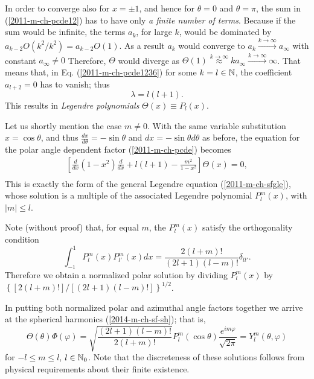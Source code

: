 In order to converge also for $x=\pm 1$, and hence for $\theta =0$ and $\theta= \pi$,
the sum in (\ref{2011-m-ch-pcde12})
has to have only {\em a finite number of terms}.
Because  if the sum would be infinite, the terms $a_k$, for large $k$,
would be dominated by $a_{k-2} O( k^2/k^2)= a_{k-2} O(1)$.
As a result  $a_k$
would converge to $a_k \stackrel{ k  \rightarrow \infty}{\longrightarrow} a_\infty$ with constant $a_\infty \neq 0$
Therefore, $\Theta$ would diverge as
$\Theta (1) \stackrel{ k  \rightarrow \infty}{\approx} k a_\infty  \stackrel{ k  \rightarrow \infty}{\longrightarrow}  \infty$.
That means that, in Eq. (\ref{2011-m-ch-pcde1236})
for some $k=l\in {\Bbb N}$, the coefficient  $a_{l+2}=0$ has to vanish; thus
\begin{equation}
\lambda = l(l+1).
\label{2011-m-ch-pcde12361}
\end{equation}
This results in {\it Legendre polynomials} $\Theta (x) \equiv P_l(x)$.


Let us shortly mention the case $m\neq 0$.
With the same variable substitution  $x = \cos \theta$, and thus
$\frac{dx}{d\theta}= -\sin \theta$ and  $dx= -\sin \theta d\theta$ as before,
the equation for the polar angle dependent factor (\ref{2011-m-ch-pcde})
becomes
\begin{equation}
\begin{split}
\left[
\frac{   d   }{   d    x }
(1-x^2) \frac{   d    }{   d    x }  +  l(l+1)   -\frac{m^2}{ 1-x^2 }
\right]
\Theta(x)  =0,\\
\end{split}
\label{2011-m-ch-pcde9}
\end{equation}
This is exactly the form of the
general Legendre equation (\ref{2011-m-ch-sfgle}), whose solution is a multiple
of the associated Legendre polynomial   $P_l^m(x)$, with $\vert m\vert \le l$.

Note (without proof) that, for equal $m$, the $P_l^m(x)$ satisfy the orthogonality condition
\begin{equation}
\int_{-1}^{1} P_l^m(x) P_{l'}^m(x) dx =
{\frac{2 (l+m)!} {(2l+1)(l-m)!}}  \delta_{l l'}.
\end{equation}
Therefore  we obtain a normalized polar solution by dividing $P_l^m(x)$
by $\left\{\left[2 (l+m)!\right]/\left[(2l+1)(l-m)!\right]\right\}^{1/2}$.

In putting both normalized  polar and azimuthal angle
factors together we arrive at the spherical harmonics (\ref{2014-m-ch-sf-sh}); that is,
\begin{equation}
\Theta(\theta)\Phi(\varphi)
= \sqrt{\frac {(2l+1)(l-m)!}{2 (l+m)!}}  P_l^m(\cos \theta ) \frac {e^{im\varphi }}{\sqrt{2\pi}} =
 Y_l^m (\theta ,\varphi )
\end{equation}
for $-l\le m\le l$, $l\in {\Bbb N}_0$.
Note that the discreteness of these solutions
follows from physical requirements about their finite
existence.

